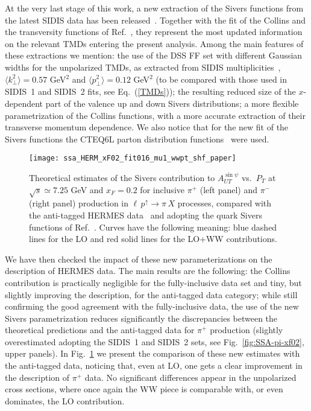 \documentclass[nofootinbib,superscriptaddress,aps]{revtex4}
\newcommand{\pup}{p^\uparrow}
\begin{document}
At the very last stage of this work, a new extraction of the Sivers functions from the latest SIDIS data has been released~\cite{Anselmino:2016uie}. Together with the fit of the Collins and the transversity functions of Ref.~\cite{Anselmino:2015sxa}, they represent the most updated information on the relevant TMDs entering the present analysis.
Among the main features of these extractions we mention: the use of the DSS FF set with different Gaussian widths for the unpolarized TMDs, as extracted from SIDIS multiplicities~\cite{Anselmino:2013lza}, $\langle k_\perp^2 \rangle = 0.57$ GeV$^2$ and $\langle p_\perp^2 \rangle = 0.12$ GeV$^2$ (to be compared with those used in SIDIS~1 and SIDIS~2 fits, see Eq.~(\ref{TMDs})); the resulting reduced size of the $x$-dependent part of the valence up and down Sivers distributions; a more flexible parametrization of the Collins functions, with a more accurate extraction of their transverse momentum dependence. We also notice that for the new fit of the Sivers functions the CTEQ6L parton distribution functions~\cite{Pumplin:2002vw} were used.

\begin{figure}[ht!]
 \centering
 \texttt{[image: ssa\_HERM\_xF02\_fit016\_mu1\_wwpt\_shf\_paper]}
 \caption{Theoretical estimates of the Sivers contribution to $A_{UT}^{\sin\psi}$ vs.~$P_T$ at $\sqrt{s}\simeq 7.25$ GeV and $x_F = 0.2$ for inclusive $\pi^+$ (left panel) and $\pi^-$ (right panel) production in $\ell \, \pup \to \pi \, X$ processes, compared with the anti-tagged HERMES data~\cite{Airapetian:2013bim} and adopting the quark Sivers functions of Ref.~\cite{Anselmino:2016uie}. Curves have the following meaning: blue dashed lines for the LO and red solid lines for the LO+WW contributions.
}
  \label{fig:SSA-pi-xf02_016}
\end{figure}

We have then checked the impact of these new parameterizations on the description of HERMES data. The main results are the following: the Collins contribution is practically negligible for the fully-inclusive data set and tiny, but slightly improving the description, for the anti-tagged data category; while still confirming the good agreement with the fully-inclusive data, the use of the new Sivers parametrization reduces significantly the discrepancies between the theoretical predictions and the anti-tagged data for $\pi^+$ production (slightly overestimated adopting the SIDIS~1 and SIDIS~2 sets, see Fig.~\ref{fig:SSA-pi-xf02}, upper panels). In Fig.~\ref{fig:SSA-pi-xf02_016} we present the comparison of these new estimates with the anti-tagged data, noticing that, even at LO, one gets a clear improvement in the description of $\pi^+$ data. No significant differences appear in the unpolarized cross sections, where once again the WW piece is comparable with, or even dominates, the LO contribution.
\end{document}
